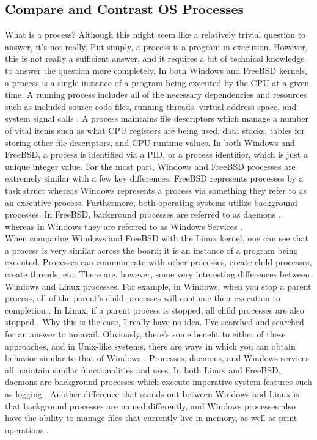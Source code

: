\documentclass[onecolumn, draftclsnofoot,10pt, compsoc]{IEEEtran}
\begin{document}
\subsection{Compare and Contrast OS Processes}
\noindent What is a process? Although this might seem like a relatively trivial question to answer, it’s not really. Put simply, a process is a program in execution. However, this is not really a sufficient answer, and it requires a bit of technical knowledge to answer the question more completely. In both Windows and FreeBSD kernels, a process is a single instance of a program being executed by the CPU at a given time. A running process includes all of the necessary dependencies and resources such as included source code files, running threads, virtual address space, and system signal calls \cite{MSWindows1PTCS} \cite{FreeBSD2PTCS}. A process maintains file descriptors which manage a number of vital items such as what CPU registers are being used, data stacks, tables for storing other file descriptors, and CPU runtime values. In both Windows and FreeBSD, a process is identified via a PID, or a process identifier, which is just a unique integer value. For the most part, Windows and FreeBSD processes are extremely similar with a few key differences. FreeBSD represents processes by a task struct whereas Windows represents a process via something they refer to as an executive process. Furthermore, both operating systems utilize background processes. In FreeBSD, background processes are referred to as daemons \cite{FreeBSD2PTCS}, whereas in Windows they are referred to as Windows Services \cite{MSWindows1PTCS}.\\

\noindent When comparing Windows and FreeBSD with the Linux kernel, one can see that a process is very similar across the board; it is an instance of a program being executed. Processes can communicate with other processes, create child processes, create threads, etc. There are, however, some very interesting differences between Windows and Linux processes. For example, in Windows, when you stop a parent process, all of the parent’s child processes will continue their execution to completion \cite{Processes}. In Linux, if a parent process is stopped, all child processes are also stopped \cite{Processes}. Why this is the case, I really have no idea. I’ve searched and searched for an answer to no avail. Obviously, there’s some benefit to either of these approaches, and in Unix-like systems, there are ways in which you can obtain behavior similar to that of Windows \cite{ProcessBehavior}. Processes, daemons, and Windows services all maintain similar functionalities and uses. In both Linux and FreeBSD, daemons are background processes which execute imperative system features such as logging \cite{FreeBSD2PTCS} \cite{Linux}. Another difference that stands out between Windows and Linux is that background processes are named differently, and Windows processes also have the ability to manage files that currently live in memory, as well as print operations \cite{MSWindows1PTCS}.\\
\end{document}
